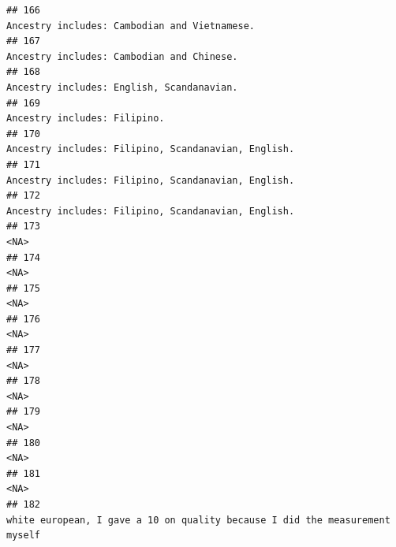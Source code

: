 \documentclass[]{article}
\begin{document}
\begin{verbatim}
## 166                                                                                                        Ancestry includes: Cambodian and Vietnamese.
## 167                                                                                                           Ancestry includes: Cambodian and Chinese.
## 168                                                                                                           Ancestry includes: English, Scandanavian.
## 169                                                                                                                        Ancestry includes: Filipino.
## 170                                                                                                 Ancestry includes: Filipino, Scandanavian, English.
## 171                                                                                                 Ancestry includes: Filipino, Scandanavian, English.
## 172                                                                                                 Ancestry includes: Filipino, Scandanavian, English.
## 173                                                                                                                                                <NA>
## 174                                                                                                                                                <NA>
## 175                                                                                                                                                <NA>
## 176                                                                                                                                                <NA>
## 177                                                                                                                                                <NA>
## 178                                                                                                                                                <NA>
## 179                                                                                                                                                <NA>
## 180                                                                                                                                                <NA>
## 181                                                                                                                                                <NA>
## 182                                                                         white european, I gave a 10 on quality because I did the measurement myself

\end{verbatim}
\end{document}
